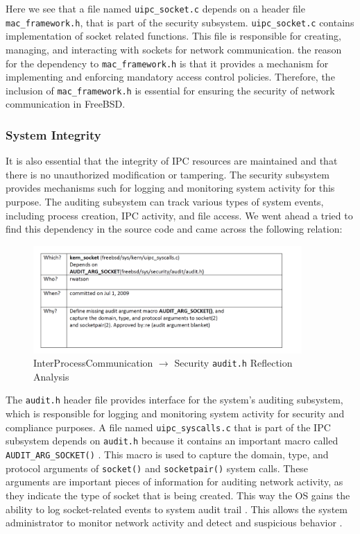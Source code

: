 \documentclass[12pt, dvipsnames, a4paper]{article}
\newcommand{\code}[1]{\texttt{#1}}
\begin{document}
Here we see that a file named \code{uipc\_socket.c} depends on a header file \code{mac\_framework.h}, that is part of the security subsystem. \code{uipc\_socket.c} contains implementation of socket related functions. This file is responsible for creating, managing, and interacting with sockets for network communication. the reason for the dependency to \code{mac\_framework.h} is that it provides a mechanism for implementing and enforcing mandatory access control policies. Therefore, the inclusion of \code{mac\_framework.h} is essential for ensuring the security of network communication in FreeBSD.

\subsubsection{System Integrity}
It is also essential that the integrity of IPC resources are maintained and that there is no unauthorized modification or tampering. The security subsystem provides mechanisms such for logging and monitoring system activity for this purpose. The auditing subsystem can track various types of system events, including process creation, IPC activity, and file access. We went ahead a tried to find this dependency in the source code and came across the following relation:

\begin{figure}[!htb]
	\centering
	\includegraphics[width=290pt]{assets/4W's_1.png}
	\caption{InterProcessCommunication $\longrightarrow$ Security \code{audit.h} Reflection Analysis}
\end{figure}

The \code{audit.h} header file provides interface for the system's auditing subsystem, which is responsible for logging and monitoring system activity for security and compliance purposes. A file named \code{uipc\_syscalls.c} that is part of the IPC subsystem depends on \code{audit.h} because it contains an important macro called \code{AUDIT\_ARG\_SOCKET()} \cite{audit}. This macro is used to capture the domain, type, and protocol arguments of \code{socket()} and \code{socketpair()} system calls. These arguments are important pieces of information for auditing network activity, as they indicate the type of socket that is being created. This way the OS gains the ability to log socket-related events to system audit trail \cite{audit}. This allows the system administrator to monitor network activity and detect and suspicious behavior \cite{audit}.
\clearpage
\end{document}
